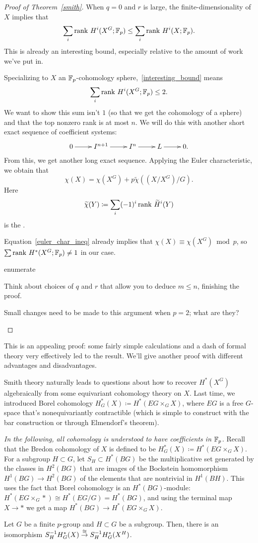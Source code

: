 \begin{proof}[Proof of Theorem~\ref{smith}]
When $q = 0$ and $r$ is large, the finite-dimensionality of $X$ implies that
\begin{equation}
\label{interesting_bound}
\sum_i\operatorname{rank\,} H^i(X^G;\mathbb F_p) \le \sum_i \operatorname{rank\,} H^i(X;\mathbb F_p).
\end{equation}
This is already an interesting bound, especially relative to the amount of work we've put in.

Specializing to $X$ an $\mathbb F_p$-cohomology sphere,~\eqref{interesting_bound} means
\[\sum_i \operatorname{rank\,} H^i(X^G;\mathbb F_p) \le 2.\]
We want to show this sum isn't $1$ (so that we get the cohomology of a sphere) and that the top nonzero rank is at
most $n$. We will do this with another short exact sequence of coefficient systems:
\[\shortexact{I^{n+1}}{I^n}{L}.\]
From this, we get another long exact sequence. Applying the Euler characteristic, we obtain that
\begin{equation}
\label{euler_char_ineq}
\chi(X) = \chi(X^G) + p\widetilde\chi((X/X^G)/G).
\end{equation}
Here
\[\widetilde\chi(Y)\coloneqq \sum_i (-1)^i\operatorname{rank\,} \widetilde H^i(Y)\]
is the .

Equation~\ref{euler_char_ineq} already implies that $\chi(X) \equiv \chi(X^G)\bmod p$, so $\sum\operatorname{rank\,}
H^*(X^G;\mathbb F_p)\ne 1$ in our case.
\begin{comp}{ex}{enumerate}
	\item Think about choices of $q$ and $r$ that allow you to deduce $m\le n$, finishing the proof.
	\item Small changes need to be made to this argument when $p = 2$; what are they?\qedhere
\end{comp}
\end{proof}
This is an appealing proof: some fairly simple calculations and a dash of formal theory very effectively led to the
result. We'll give another proof with different advantages and disadvantages.

Smith theory naturally leads to questions about how to recover $H^*(X^G)$ algebraically from some equivariant
cohomology theory on $X$. Last time, we introduced Borel cohomology $H_G^*(X) \coloneqq H^*(EG\times_G X)$, where
$EG$ is a free $G$-space that's nonequivariantly contractible (which is simple to construct with the bar
construction or through Elmendorf's theorem).

\emph{In the following, all cohomology is understood to have coefficients in $\mathbb F_p$.} Recall that the Bredon
cohomology of $X$ is defined to be $H_G^*(X)\coloneqq H^*(EG\times_G X)$. For a subgroup $H\subset G$, let
$S_H\subset H^*(BG)$ be the multiplicative set generated by the classes in $H^2(BG)$ that are images of the
Bockstein homomorphism $H^1(BG)\to H^2(BG)$ of the elements that are nontrivial in $H^1(BH)$. This uses the fact
that Borel cohomology is an $H^*(BG)$-module: $H^*(EG\times_G *) \cong H^*(EG/G) = H^*(BG)$, and using the terminal
map $X\to *$ we get a map $H^*(BG)\to H^*(EG\times_G X)$.
\begin{thm}
\label{localization}
Let $G$ be a finite $p$-group and $H\subset G$ be a subgroup. Then, there is an isomorphism
$S_H^{-1}H_G^*(X)\stackrel\cong\to S_H^{-1}H_G^*(X^H)$.
\end{thm}

